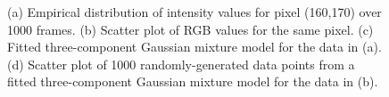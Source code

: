 \begin{figure}[t]
\caption{(a) Empirical distribution of intensity values for pixel (160,170)
over 1000 frames. (b) Scatter plot of RGB values for the same pixel.
(c) Fitted three-component Gaussian mixture model for the data in (a).
(d) Scatter plot of 1000 randomly-generated data points from a fitted
three-component Gaussian mixture model for the data in (b).}
\label{pixel-model-figure}
\end{figure}

